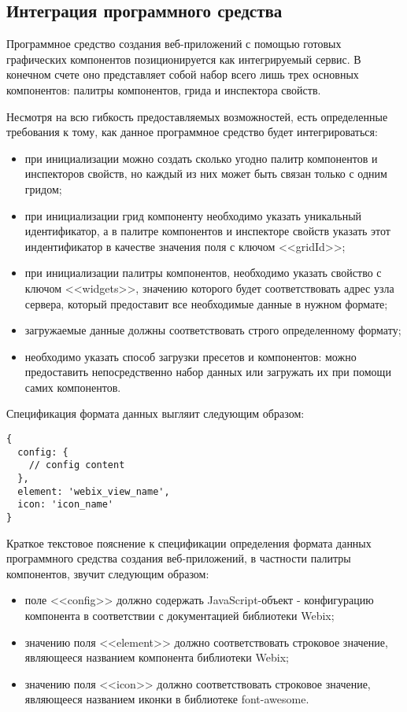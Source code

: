 \subsection{Интеграция программного средства}
\label{sec:manual:integration}

Программное средство создания веб-приложений с помощью готовых графических компонентов позиционируется как интегрируемый сервис. В конечном счете оно представляет собой набор всего лишь трех основных компонентов: палитры компонентов, грида и инспектора свойств. 

Несмотря на всю гибкость предоставляемых возможностей, есть определенные требования к тому, как данное программное средство будет интегрироваться:
\begin{itemize}
	\item при инициализации можно создать сколько угодно палитр компонентов и инспекторов свойств, но каждый из них может быть связан только с одним гридом;
	\item при инициализации грид компоненту необходимо указать уникальный идентификатор, а в палитре компонентов и инспекторе свойств указать этот индентификатор в качестве значения поля с ключом <<gridId>>;
	\item при инициализации палитры компонентов, необходимо указать свойство с ключом <<widgets>>, значению которого будет соответствовать адрес узла сервера, который предоставит все необходимые данные в нужном формате;
	\item загружаемые данные должны соответствовать строго определенному формату;
	\item необходимо указать способ загрузки пресетов и компонентов: можно предоставить непосредственно набор данных или загружать их при помощи самих компонентов. 
\end{itemize}

Спецификация формата данных выгляит следующим образом:
\begin{lstlisting}
{
  config: { 
    // config content
  },
  element: 'webix_view_name',
  icon: 'icon_name'
}
\end{lstlisting}

Краткое текстовое пояснение к спецификации определения формата данных программного средства создания веб-приложений, в частности палитры компонентов, звучит следующим образом:
\begin{itemize}
	\item поле <<config>> должно содержать JavaScript-объект - конфигурацию компонента в соответствии с документацией библиотеки Webix;
	\item значению поля <<element>> должно соответствовать строковое значение, являющееся названием компонента библиотеки Webix;
	\item значению поля <<icon>> должно соответствовать строковое значение, являющееся названием иконки в библиотеке font-awesome.
\end{itemize}

